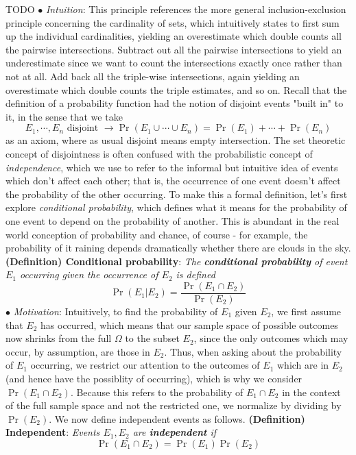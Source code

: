 \documentclass{article}
\newcommand*{\tb}{\textbf}
\newcommand*{\ti}{\textit}
\newcommand*{\n}{\newline}
\newcommand*{\nn}{\newline \newline}
\newcommand*{\In}{\indent \ensuremath{\bullet} \textit{Intuition}: }
\newcommand*{\Mo}{\indent \ensuremath{\bullet} \textit{Motivation}: }
\begin{document}
TODO
\n
\In This principle references the more general inclusion-exclusion principle concerning the cardinality of sets, which intuitively states to first sum up the individual cardinalities, yielding an overestimate which double counts all the pairwise intersections. Subtract out all the pairwise intersections to yield an underestimate since we want to count the intersections exactly once rather than not at all. Add back all the triple-wise intersections, again yielding an overestimate which double counts the triple estimates, and so on.
\nn
Recall that the definition of a probability function had the notion of disjoint events "built in" to it, in the sense that we take
$$ E_1, \cdots, E_n \text{ disjoint } \rightarrow \Pr(E_1 \cup \cdots \cup E_n) = \Pr(E_1) + \cdots + \Pr(E_n) $$
as an axiom, where as usual disjoint means empty intersection. The set theoretic concept of disjointness is often confused with the probabilistic concept of \ti{independence}, which we use to refer to the informal but intuitive idea of events which don't affect each other; that is, the occurrence of one event doesn't affect the probability of the other occurring. To make this a formal definition, let's first explore \ti{conditional probability}, which defines what it means for the probability of one event to depend on the probability of another. This is abundant in the real world conception of probability and chance, of course - for example, the probability of it raining depends dramatically whether there are clouds in the sky.
\nn
\tb{(Definition) Conditional probability}: \ti{The \tb{conditional probability} of event $ E_1 $ occurring given the occurrence of $ E_2 $ is defined}
$$ \Pr(E_1 | E_2) = \frac{\Pr(E_1 \cap E_2)}{\Pr(E_2)} $$
\n
\Mo Intuitively, to find the probability of $ E_1 $ given $ E_2 $, we first assume that $ E_2 $ has occurred, which means that our sample space of possible outcomes now shrinks from the full $ \Omega $ to the subset $ E_2 $, since the only outcomes which may occur, by assumption, are those in $ E_2 $. Thus, when asking about the probability of $ E_1 $ occurring, we restrict our attention to the outcomes of $ E_1 $ which are in $ E_2 $ (and hence have the possiblity of occurring), which is why we consider $ \Pr(E_1 \cap E_2) $. Because this refers to the probability of $ E_1 \cap E_2 $ in the context of the full sample space and not the restricted one, we normalize by dividing by $ \Pr(E_2) $.
\nn
We now define independent events as follows.
\nn
\tb{(Definition) Independent}: \ti{Events $ E_1, E_2 $ are \tb{independent} if}
$$ \Pr(E_1 \cap E_2) = \Pr(E_1) \Pr(E_2) $$
\end{document}
